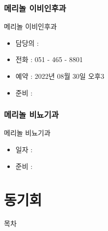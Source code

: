 \documentclass[aspectratio=1610,17pt,xcolor=pdftex,dvipsnames,table,handout]{beamer}
\begin{document}
		\section{메리놀 이비인후과}
		

		\begin{frame} [t,plain]
			\begin{block} {메리놀 이비인후과}
			\begin{itemize}
					\item 담당의 : 
					\item 전화 : 051 - 465 - 8801
					\item 예약 : 2022년 08월 30일 오후3
					\item 준비 :
			\end{itemize}
			\end{block}
		\end{frame}

		\section{메리놀 비뇨기과}
		

		\begin{frame} [t,plain]
			\begin{block} {메리놀 비뇨기과}
			\begin{itemize}
					\item 일자 : 
					\item 준비 :
			\end{itemize}
			\end{block}
		\end{frame}



		\part{동기회 }
		\frame{\partpage}


		\begin{frame} [plain]{목차}
		\tableofcontents
		\end{frame}
		
\end{document}
